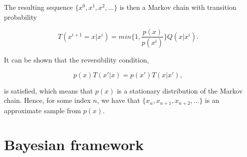 The resulting sequence $\{  x^0, x^1, x^2,... \}$ is then a Markov chain with transition probability

\begin{equation}
    T(x^{i+1} = x|x^i) = min \Big \{ 1, \frac{p(x)}{p(x^i)} \Big \} Q(x|x^i).
\end{equation}

It can be shown that the reversibility condition, 

\begin{equation}
    p(x)T(x'|x) = p(x')T(x|x'),
\end{equation} 

is satisfied, which means that $p(x)$ is a stationary distribution of the Markov chain. Hence, for some index $n$, we have that $\{x_n, x_{n+1}, x_{n+2},...\}$ is an approximate sample from $p(x)$.





\section{Bayesian framework}
\label{BayesianFW}

